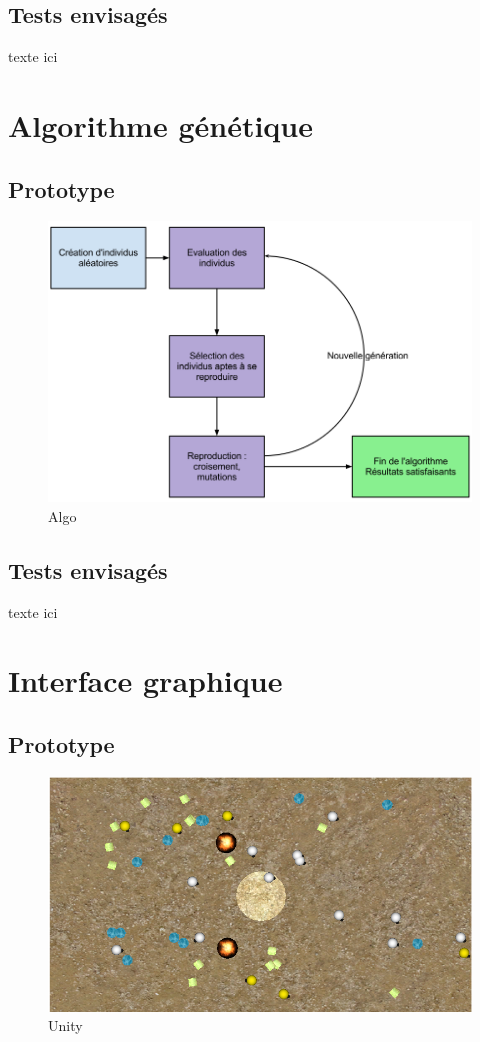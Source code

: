 \subsection{Tests envisagés}
texte ici

\section{Algorithme génétique}

\subsection{Prototype}
\begin{figure}[H]
    \centering
    \includegraphics[width=1\textwidth]{./pictures/algo_creatures.png}
    \caption{Algo }
\end{figure}


\subsection{Tests envisagés}
texte ici

\section{Interface graphique}
\subsection{Prototype}
\begin{figure}[H]
    \centering
    \includegraphics[width=1\textwidth]{./pictures/unity.png}
    \caption{Unity}
\end{figure}

